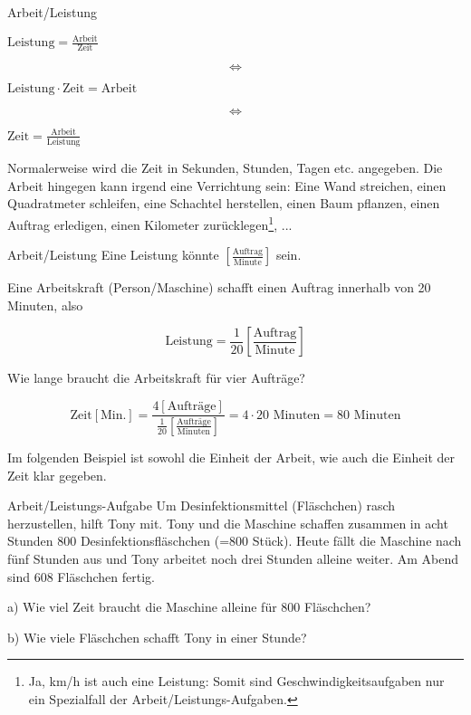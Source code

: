 \begin{gesetz}{Arbeit/Leistung}{}
  \begin{center}
    $\textrm{Leistung} = \frac{\mathrm{Arbeit}}{\mathrm{Zeit}}$
  \end{center}
  
  $$\Longleftrightarrow$$
  \begin{center}
    $\mathrm{Leistung} \cdot{} \textrm{Zeit} = \textrm{Arbeit}$
  \end{center}

  $$\Longleftrightarrow$$
  \begin{center}
    $\textrm{Zeit} = \frac{\mathrm{Arbeit}}{\mathrm{Leistung}}$
  \end{center}
 
\end{gesetz}

Normalerweise wird die Zeit in Sekunden, Stunden, Tagen etc. angegeben. Die
Arbeit hingegen kann irgend eine Verrichtung sein: Eine Wand
streichen, einen Quadratmeter schleifen, eine Schachtel herstellen,
einen Baum pflanzen, einen Auftrag erledigen, einen Kilometer zurücklegen\footnote{Ja, km/h ist auch eine Leistung: Somit sind Geschwindigkeitsaufgaben nur ein Spezialfall der Arbeit/Leistungs-Aufgaben.}, ...

\begin{beispiel}{Arbeit/Leistung}{}
  Eine Leistung könnte  $\left[\frac{\textrm{Auftrag}}{\textrm{Minute}}\right]$ sein.

  Eine Arbeitskraft (Person/Maschine) schafft einen Auftrag innerhalb von 20 Minuten, also

  $$\textrm{Leistung} = \frac1{20} \left[\frac{\textrm{Auftrag}}{\textrm{Minute}}\right]$$

  Wie lange braucht die Arbeitskraft für vier Aufträge?

  $$\textrm{Zeit} [\textrm{Min.}] = \frac{4[\textrm{Aufträge}]}{\frac{1}{20} \left[\frac{\textrm{Aufträge}}{\textrm{Minuten}}\right]} = 4\cdot{} 20 \textrm{ Minuten} = 80 \textrm{ Minuten}$$
\end{beispiel}


\newpage

Im folgenden Beispiel ist sowohl die Einheit der Arbeit, wie auch die
Einheit der Zeit klar gegeben.

\begin{beispiel}{Arbeit/Leistungs-Aufgabe}{}
  Um Desinfektionsmittel (Fläschchen) rasch herzustellen, hilft Tony mit.
  Tony und die Maschine schaffen zusammen in acht Stunden 800
  Desinfektionsfläschchen (=800 Stück).
  Heute fällt die Maschine nach fünf Stunden aus und Tony arbeitet noch
  drei Stunden alleine weiter. Am Abend sind 608 Fläschchen fertig.

  a) Wie viel Zeit braucht die Maschine alleine für 800 Fläschchen?

  b) Wie viele Fläschchen schafft Tony in einer Stunde?
\end{beispiel}

